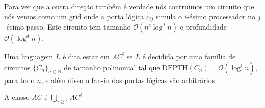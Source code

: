 Para ver que a outra direção também é verdade nós contruimos um circuito que nós vemos como um grid onde a porta lógica $c_{ij}$ simula o $i$-ésimo processador no $j$-ésimo passo. Este circuito tem tamanho $\mathcal{O}(n^{c}\log^{d}n)$ e profundidade $\mathcal{O}(\log^{d}n)$.


\begin{defi}

Uma linguagem $L$ é dita estar em $AC^{i}$ se $L$ é decidida por uma família de circuitos $\{C_{n}\}_{n \in \mathbb{N}}$ de tamanho polinomial tal que $\text{DEPTH}(C_{n}) = \mathcal{O}(\log^{i} n)$, para todo $n$, e além disso o fan-in das portas lógicas são arbitrários.

A classe $AC$ é $\bigcup_{i \geq 1}AC^{i}$

\end{defi}
